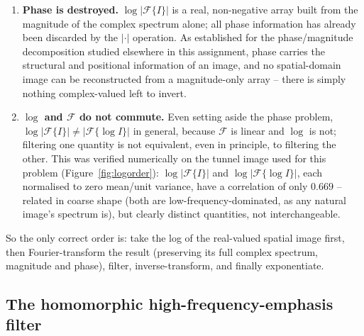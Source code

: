 \documentclass[11pt]{article}
\begin{document}
\begin{enumerate}[leftmargin=1.5em]
  \item \textbf{Phase is destroyed.} $\log|\mathcal{F}\{I\}|$ is a real, non-negative
  array built from the magnitude of the complex spectrum alone; all phase information
  has already been discarded by the $|\cdot|$ operation. As established for the
  phase/magnitude decomposition studied elsewhere in this assignment, phase carries the
  structural and positional information of an image, and no spatial-domain image can be
  reconstructed from a magnitude-only array -- there is simply nothing complex-valued
  left to invert.
  \item \textbf{$\log$ and $\mathcal{F}$ do not commute.} Even setting aside the phase
  problem, $\log|\mathcal{F}\{I\}| \ne |\mathcal{F}\{\log I\}|$ in general, because
  $\mathcal{F}$ is linear and $\log$ is not; filtering one quantity is not equivalent, even
  in principle, to filtering the other. This was verified numerically on the tunnel image
  used for this problem (Figure~\ref{fig:logorder}): $\log|\mathcal{F}\{I\}|$ and
  $\log|\mathcal{F}\{\log I\}|$, each normalised to zero mean/unit variance, have a
  correlation of only $0.669$ -- related in coarse shape (both are low-frequency-dominated,
  as any natural image's spectrum is), but clearly distinct quantities, not
  interchangeable.
\end{enumerate}

So the only correct order is: take the log of the real-valued spatial image first, then
Fourier-transform the result (preserving its full complex spectrum, magnitude and
phase), filter, inverse-transform, and finally exponentiate.

\subsection{The homomorphic high-frequency-emphasis filter}
\end{document}
